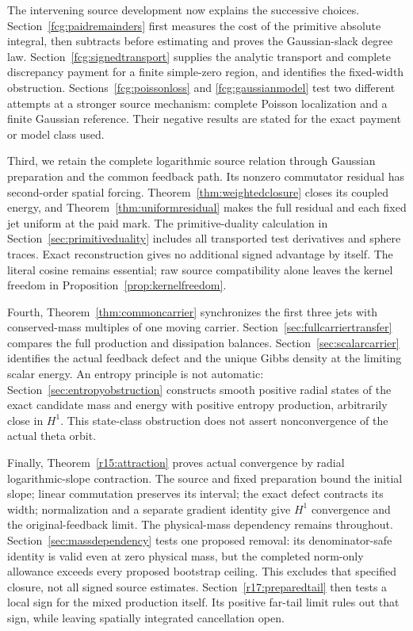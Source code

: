 \documentclass[11pt]{article}
\numberwithin{equation}{section}
\begin{document}
The intervening source development now explains the successive choices.
Section~\ref{fcg:paidremainders} first measures the cost of the primitive
absolute integral, then subtracts before estimating and proves the
Gaussian-slack degree law. Section~\ref{fcg:signedtransport} supplies
the analytic transport and complete discrepancy payment for a finite
simple-zero region, and identifies the fixed-width obstruction.
Sections~\ref{fcg:poissonloss} and \ref{fcg:gaussianmodel} test two
different attempts at a stronger source mechanism: complete Poisson
localization and a finite Gaussian reference. Their negative results
are stated for the exact payment or model class used.

Third, we retain the complete logarithmic source relation through
Gaussian preparation and the common feedback path. Its nonzero
commutator residual has second-order spatial forcing.
Theorem~\ref{thm:weightedclosure} closes its coupled energy, and
Theorem~\ref{thm:uniformresidual} makes the full residual and each fixed
jet uniform at the paid mark. The primitive-duality calculation in
Section~\ref{sec:primitiveduality} includes all transported test
derivatives and sphere traces. Exact reconstruction gives no additional
signed advantage by itself. The literal cosine remains essential;
raw source compatibility alone leaves the kernel freedom in
Proposition~\ref{prop:kernelfreedom}.

Fourth, Theorem~\ref{thm:commoncarrier} synchronizes the first three jets
with conserved-mass multiples of one moving carrier.
Section~\ref{sec:fullcarriertransfer} compares the full production and
dissipation balances. Section~\ref{sec:scalarcarrier} identifies the
actual feedback defect and the unique Gibbs density at the limiting
scalar energy. An entropy principle is not automatic:
Section~\ref{sec:entropyobstruction} constructs smooth positive radial
states of the exact candidate mass and energy with positive entropy
production, arbitrarily close in $H^1$. This state-class obstruction
does not assert nonconvergence of the actual theta orbit.

Finally, Theorem~\ref{r15:attraction} proves actual convergence by radial
logarithmic-slope contraction. The source and fixed preparation bound
the initial slope; linear commutation preserves its interval; the exact
defect contracts its width; normalization and a separate gradient
identity give $H^1$ convergence and the original-feedback limit.
The physical-mass dependency remains throughout.
Section~\ref{sec:massdependency} tests one proposed removal: its
denominator-safe identity is valid even at zero physical mass, but the
completed norm-only allowance exceeds every proposed bootstrap ceiling.
This excludes that specified closure, not all signed source estimates.
Section~\ref{r17:preparedtail} then tests a local sign for the mixed
production itself. Its positive far-tail limit rules out that sign,
while leaving spatially integrated cancellation open.
\end{document}
